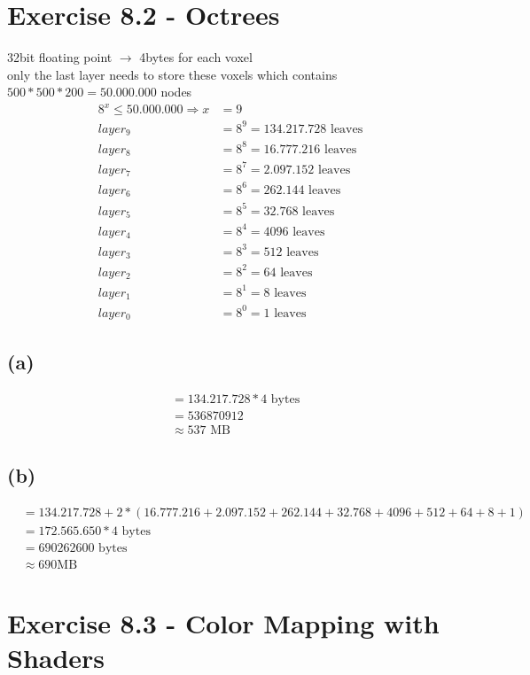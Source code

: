 \documentclass[a4paper]{article}
\begin{document}
\section*{Exercise 8.2 - Octrees}

32bit floating point $\rightarrow$ 4bytes for each voxel\\
only the last layer needs to store these voxels which contains $ 500*500*200 = 50.000.000 $ nodes
\begin{align*}
8^x \leq 50.000.000 \Rightarrow x &= 9\\
layer_{9} &= 8^9 = 134.217.728 \text{ leaves}\\
layer_{8} &= 8^8 = 16.777.216 \text{ leaves}\\
layer_{7} &= 8^7 = 2.097.152 \text{ leaves}\\
layer_{6} &= 8^6 = 262.144 \text{ leaves}\\
layer_{5} &= 8^5 = 32.768 \text{ leaves}\\
layer_{4} &= 8^4 = 4096 \text{ leaves}\\
layer_{3} &= 8^3 = 512 \text{ leaves}\\
layer_{2} &= 8^2 = 64 \text{ leaves}\\
layer_{1} &= 8^1 = 8 \text{ leaves}\\
layer_{0} &= 8^0 = 1 \text{ leaves}
\end{align*}

\subsection*{(a)}
\begin{align*}
&= 134.217.728 * 4 \text{ bytes}\\
&= 536870912\\
&\approx 537\text{ MB}
\end{align*}
\subsection*{(b)}
\begin{align*}
&= 134.217.728 + 2*(16.777.216 + 2.097.152 + 262.144 + 32.768 + 4096 + 512 + 64 + 8 + 1)\\
&= 172.565.650 * 4 \text{ bytes} \\
&= 690262600 \text{ bytes}\\
&\approx 690 \text{MB}
\end{align*}

\newpage
\section*{Exercise 8.3 - Color Mapping with Shaders}
\end{document}
